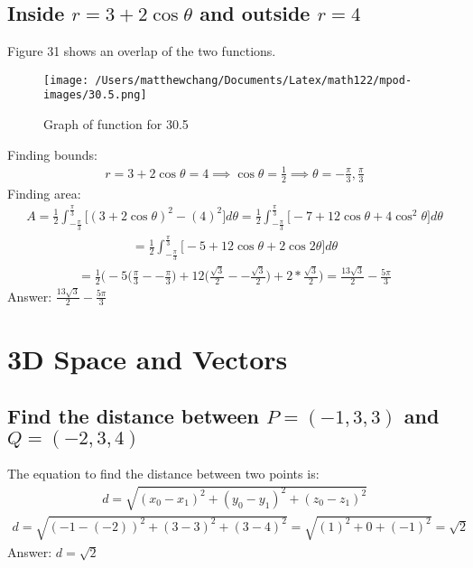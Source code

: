 \documentclass{article}
\begin{document}
\subsection{Inside $r = 3 + 2 \cos{\theta}$ and outside $r = 4$}
Figure 31 shows an overlap of the two functions. \\[10pt]
\begin{figure}
	\centering
	\texttt{[image: /Users/matthewchang/Documents/Latex/math122/mpod-images/30.5.png]}
	\caption{Graph of function for 30.5}
\end{figure}
Finding bounds:
\begin{align*}
	r = 3 + 2\cos{\theta} = 4 \implies \cos{\theta} = \frac{1}{2} \implies \theta = -\frac{\pi}{3}, \frac{\pi}{3}
\end{align*}
Finding area:
\begin{align*}
	A = \frac{1}{2} \int_{-\frac{\pi}{3}}^{\frac{\pi}{3}} \bigg[ (3 + 2\cos{\theta})^2 - (4)^2 \bigg] d\theta = \frac{1}{2} \int_{-\frac{\pi}{3}}^{\frac{\pi}{3}} \bigg[ -7 + 12\cos{\theta} + 4\cos^2{\theta} \bigg] d\theta
\end{align*}
\begin{align*}
	= \frac{1}{2} \int_{-\frac{\pi}{3}}^{\frac{\pi}{3}} \bigg[ -5 + 12\cos{\theta} + 2\cos{2\theta} \bigg] d\theta
\end{align*}
\begin{align*}
	= \frac{1}{2} \bigg( -5 \bigg( \frac{\pi}{3} - -\frac{\pi}{3} \bigg) + 12 \bigg( \frac{\sqrt{3}}{2} - -\frac{\sqrt{3}}{2} \bigg) + 2*\frac{\sqrt{3}}{2} \bigg) = \frac{13\sqrt{3}}{2} - \frac{5\pi}{3}
\end{align*}
Answer: $\frac{13\sqrt{3}}{2} - \frac{5\pi}{3}$

\section{3D Space and Vectors}
\subsection{Find the distance between $P = (-1, 3, 3)$ and $Q = (-2, 3, 4)$}
The equation to find the distance between two points is:
\begin{align*}
	d = \sqrt{(x_0 - x_1)^2 + (y_0 - y_1)^2 + (z_0 - z_1)^2}
\end{align*}
\begin{align*}
	d = \sqrt{(-1 - (-2))^2 + (3 - 3)^2 + (3 - 4)^2} = \sqrt{(1)^2 + 0 + (-1)^2} = \sqrt{2}
\end{align*}
Answer: $d = \sqrt{2}$
\end{document}

